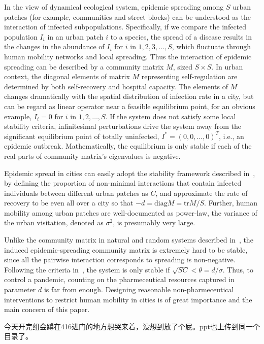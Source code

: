 In the view of dynamical ecological system, epidemic spreading among $S$ urban patches (for example, communities and street blocks) can be understood as the interaction of infected subpopulations. Specifically, if we compare the infected population $I_{i}$ in an urban patch $i$ to a species, the spread of a disease results in the changes in the abundance of $I_{i}$ for $i$ in $1,2,3,\dots, S$, which fluctuate through human mobility networks and local spreading. Thus the interaction of epidemic spreading can be described by a community matrix $M$, sized $S\times S$. In urban context, the diagonal elements of matrix $M$ representing self-regulation are determined by both self-recovery and hospital capacity. The elements of $M$ changes dramatically with the spatial distribution of infection rate in a city, but can be regard as linear operator near a feasible equilibrium point, for an obvious example, $I_{i} = 0$ for $i$ in $1,2,\dots, S$. If the system does not satisfy some local stability criteria, infinitesimal perturbations drive the system away from the significant equilibrium point of totally uninfected, $I^{*} = {(0,0,\dots, 0)}^T$, i.e., an epidemic outbreak. Mathematically, the equilibrium is only stable if each of the real parts of community matrix's eigenvalues is negative.

Epidemic spread in cities can easily adopt the stability framework described in~\cite{allesina2012stability}, by defining the proportion of non-minimal interactions that contain infected individuals between different urban patches as $C$, and approximate the rate of recovery to be even all over a city so that $-d = \text{diag} M = \text{tr} M / S$. Further, human mobility among urban patches are well-documented as power-law, the variance of the urban visitation, denoted as $\sigma^2$, is presumably very large.

Unlike the community matrix in natural and random systems described in~\cite{may1972will, allesina2012stability}, the induced epidemic-spreading community matrix is extremely hard to be stable, since all the pairwise interaction corresponds to spreading is non-negative. Following the criteria in~\cite{allesina2012stability}, the system is only stable if $\sqrt{SC} < \theta = d / \sigma$. Thus, to control a pandemic, counting on the pharmeceutical resources captured in parameter $d$ is far from enough. Designing reasonable non-pharmeceutical interventions to restrict human mobility in cities is of great importance and the main concern of this paper.

今天开完组会蹲在416进门的地方想哭来着，没想到放了个屁。ppt也上传到同一个目录了。

